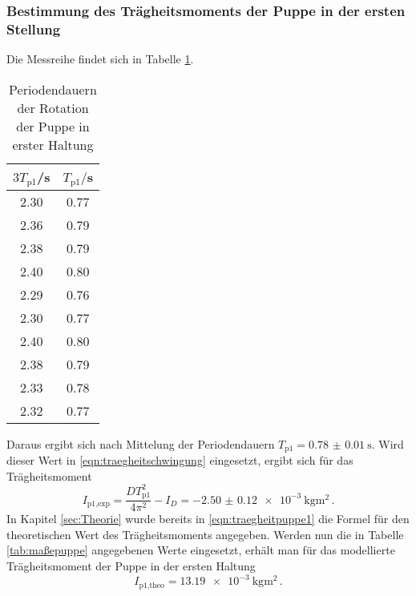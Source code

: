 \subsubsection{Bestimmung des Trägheitsmoments der Puppe in der ersten Stellung}
Die Messreihe findet sich in Tabelle \ref{tab:puppe1}.
\begin{table}
\centering
\caption{Periodendauern der Rotation der Puppe in erster Haltung}
\label{tab:puppe1}
\begin{tabular}{c c}
\toprule
$3T_{\text{p1}}$/s & $T_{\text{p1}}/$s \\
\midrule
2.30 & 0.77 \\
2.36 & 0.79 \\
2.38 & 0.79 \\
2.40 & 0.80 \\
2.29 & 0.76 \\
2.30 & 0.77 \\
2.40 & 0.80 \\
2.38 & 0.79 \\
2.33 & 0.78 \\
2.32 & 0.77 \\
\bottomrule
\end{tabular}
\end{table}

Daraus ergibt sich nach Mittelung der Periodendauern
$T_{\text{p1}}=\SI{0.78(001)}{\second}$. Wird dieser Wert in
\eqref{eqn:traegheitschwingung} eingesetzt, ergibt sich für das Trägheitsmoment
\begin{equation}
  I_{\text{p1,exp}} = \frac{DT_{\text{p1}}^2}{4\pi^2}-I_D = \SI{-2.50(012)e-3}{\kilogram\meter\squared}\,.
\end{equation}
In Kapitel \ref{sec:Theorie} wurde bereits in \eqref{eqn:traegheitpuppe1} die
Formel für den theoretischen Wert des Trägheitsmoments angegeben. Werden nun die
in Tabelle \ref{tab:maßepuppe} angegebenen Werte eingesetzt, erhält man für das
modellierte Trägheitsmoment der Puppe in der ersten Haltung
\begin{equation}
  I_{\text{p1,theo}} = \SI{13.19e-3}{\kilogram\meter\squared}\,.
\end{equation}
